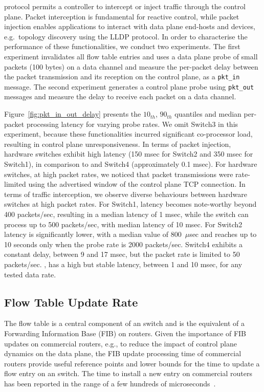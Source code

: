 \of protocol permits a controller to intercept or inject traffic through the
control plane. Packet interception is fundamental for reactive control, while
packet injection enables applications to interact with data plane end-hosts and
devices, e.g.~topology discovery using the LLDP protocol.  In order to
characterise the performance of these functionalities, we conduct two
experiments.  The first experiment invalidates all flow table entries and uses a
data plane probe of small packets (100 bytes) on a data channel and  measure the
per-packet delay between the packet transmission and its reception on the
control plane, as a \texttt{pkt\_in} message. The second experiment generates a
control plane probe using \texttt{pkt\_out} messages and measure the delay to
receive each packet on a data channel.  

Figure~\ref{fig:pkt_in_out_delay} presents the $10_{th}$, $90_{th}$ quantiles and
median per-packet processing latency for varying probe rates. We omit Switch3 in
this experiment, because these functionalities incurred significant co-processor
load, resulting in control plane unresponsiveness.  In terms of packet
injection, hardware switches exhibit high latency (150 msec for Switch2 and 350
msec for Switch1), in comparison to \ovs and Switch4 (approximately 0.1 msec).
For hardware switches, at high packet rates, we noticed that packet
transmissions were rate-limited using the advertised window of the control plane
TCP connection. In terms of traffic interception, we observe diverse behaviours
between hardware switches at high packet rates. For Switch1, latency becomes
note-worthy beyond 400 packets/sec, resulting in a median latency of 1 msec,
while the switch can process up to 500 packets/sec, with median latency of 10
msec. For Switch2 latency is significantly lower, with a median value of
800~$\mu$sec and reaches up to 10 seconds only when the probe rate is 2000
packets/sec. Switch4 exhibits a constant delay, between 9 and 17 msec, but the
packet rate is limited to 50 packets/sec.  \ovs, has a high but stable latency,
between 1 and 10 msec, for any tested data rate. 

\subsection{Flow Table Update Rate}\label{sec:results-rate}

The flow table is a central component of an \of switch and is the equivalent of
a Forwarding Information Base (FIB) on routers. Given the importance of FIB
updates on commercial routers, e.g., to reduce the impact of control plane
dynamics on the data plane, the FIB update processing time of commercial routers
provide useful reference points and lower bounds for the time to update a flow
entry on an \of switch. The time to install a new entry on commercial routers
has been reported in the range of a few hundreds of
microseconds~.


